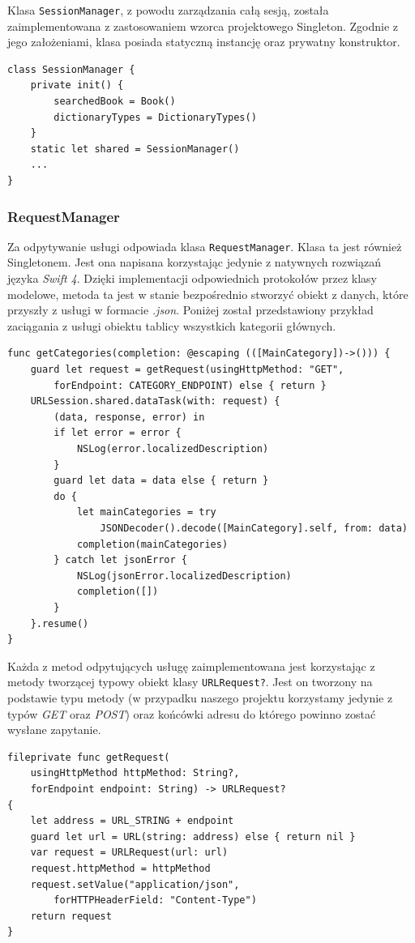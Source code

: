 \documentclass[twoside]{projektInzynierskiMS}
\begin{document}
Klasa \verb`SessionManager`, z powodu zarządzania całą sesją, została zaimplementowana z zastosowaniem wzorca projektowego Singleton. Zgodnie z jego założeniami, klasa posiada statyczną instancję oraz prywatny konstruktor.
\begin{verbatim}
class SessionManager {
    private init() {
        searchedBook = Book()
        dictionaryTypes = DictionaryTypes()
    }
    static let shared = SessionManager()
    ...
}
\end{verbatim}




\subsubsection{RequestManager}

Za odpytywanie usługi odpowiada klasa \verb`RequestManager`. Klasa ta jest również Singletonem. Jest ona napisana korzystając jedynie z natywnych rozwiązań języka \textit{Swift 4}. Dzięki implementacji odpowiednich protokołów przez klasy modelowe, metoda ta jest w stanie bezpośrednio stworzyć obiekt z danych, które przyszły z usługi w formacie \textit{.json}. Poniżej został przedstawiony przykład zaciągania z usługi obiektu tablicy wszystkich kategorii głównych.
\begin{verbatim}
func getCategories(completion: @escaping (([MainCategory])->())) {
    guard let request = getRequest(usingHttpMethod: "GET",
        forEndpoint: CATEGORY_ENDPOINT) else { return }
    URLSession.shared.dataTask(with: request) {
        (data, response, error) in
        if let error = error {
            NSLog(error.localizedDescription)
        }
        guard let data = data else { return }
        do {
            let mainCategories = try
                JSONDecoder().decode([MainCategory].self, from: data)
            completion(mainCategories)
        } catch let jsonError {
            NSLog(jsonError.localizedDescription)
            completion([])
        }
    }.resume()
}
\end{verbatim}

Każda z metod odpytujących usługę zaimplementowana jest korzystając z metody tworzącej typowy obiekt klasy \verb`URLRequest?`. Jest on tworzony na podstawie typu metody (w przypadku naszego projektu korzystamy jedynie z typów \textit{GET} oraz \textit{POST}) oraz końcówki adresu do którego powinno zostać wysłane zapytanie.
\begin{verbatim}
fileprivate func getRequest(
    usingHttpMethod httpMethod: String?,
    forEndpoint endpoint: String) -> URLRequest?
{
    let address = URL_STRING + endpoint
    guard let url = URL(string: address) else { return nil }
    var request = URLRequest(url: url)
    request.httpMethod = httpMethod
    request.setValue("application/json",
        forHTTPHeaderField: "Content-Type")
    return request
}
\end{verbatim}
\end{document}
